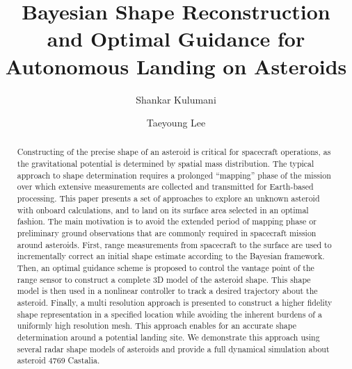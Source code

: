 \documentclass[smallextended]{svjour3}       %
\title{Bayesian Shape Reconstruction and Optimal Guidance for Autonomous Landing on Asteroids}
\author{Shankar Kulumani         \and
        Taeyoung Lee %
}
\institute{S. Kulumani (corresponding author) \at
              Mechanical and Aerospace Engineering, The George Washington University, Washington DC, 20052\\
              \email{shanks.k@gmail.com}           %
           \and
           T. Lee,  \at
              Mechanical and Aerospace Engineering, The George Washington University, Washington DC, 20052\\
              \email{tylee@gwu.edu}
}
\begin{document}
\maketitle

\begin{abstract}
    Constructing of the precise shape of an asteroid is critical for spacecraft operations, as the gravitational potential is determined by spatial mass distribution.
    The typical approach to shape determination requires a prolonged ``mapping'' phase of the mission over which extensive measurements are collected and transmitted for Earth-based processing.
    This paper presents a set of approaches to explore an unknown asteroid with onboard calculations, and to land on its surface area selected in an optimal fashion. 
    The main motivation is to avoid the extended period of mapping phase or preliminary ground observations that are commonly required in spacecraft mission around asteroids. 
    First, range measurements from spacecraft to the surface are used to incrementally correct an initial shape estimate according to the Bayesian framework. 
    Then, an optimal guidance scheme is proposed to control the vantage point of the range sensor to construct a complete 3D model of the asteroid shape. 
    This shape model is then used in a nonlinear controller to track a desired trajectory about the asteroid.
    Finally, a multi resolution approach is presented to construct a higher fidelity shape representation in a specified location while avoiding the inherent burdens of a uniformly high resolution mesh. 
    This approach enables for an accurate shape determination around a potential landing site.
    We demonstrate this approach using several radar shape models of asteroids and provide a full dynamical simulation about asteroid 4769 Castalia.
\end{abstract}

\end{document}
